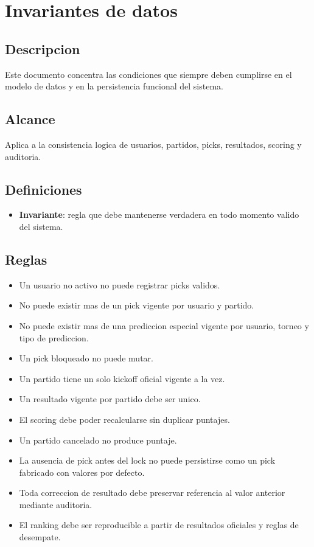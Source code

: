 \section{Invariantes de datos}

\subsection{Descripcion}

Este documento concentra las condiciones que siempre deben cumplirse en el modelo de datos y en la persistencia funcional del sistema.

\subsection{Alcance}

Aplica a la consistencia logica de usuarios, partidos, picks, resultados, scoring y auditoria.

\subsection{Definiciones}

\begin{itemize}
  \item \textbf{Invariante}: regla que debe mantenerse verdadera en todo momento valido del sistema.
\end{itemize}

\subsection{Reglas}

\begin{itemize}
  \item Un usuario no activo no puede registrar picks validos.
  \item No puede existir mas de un pick vigente por usuario y partido.
  \item No puede existir mas de una prediccion especial vigente por usuario, torneo y tipo de prediccion.
  \item Un pick bloqueado no puede mutar.
  \item Un partido tiene un solo kickoff oficial vigente a la vez.
  \item Un resultado vigente por partido debe ser unico.
  \item El scoring debe poder recalcularse sin duplicar puntajes.
  \item Un partido cancelado no produce puntaje.
  \item La ausencia de pick antes del lock no puede persistirse como un pick fabricado con valores por defecto.
  \item Toda correccion de resultado debe preservar referencia al valor anterior mediante auditoria.
  \item El ranking debe ser reproducible a partir de resultados oficiales y reglas de desempate.
\end{itemize}

